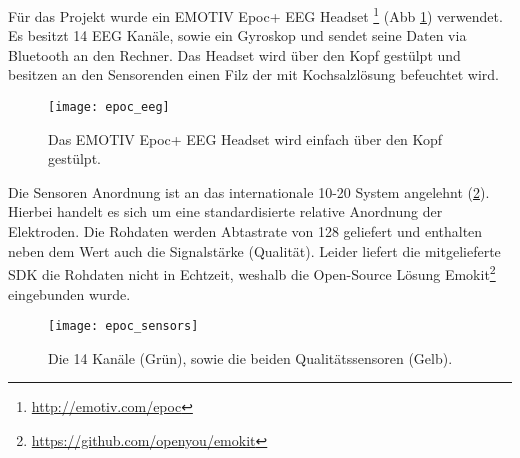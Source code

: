 \label{chap:eeg}
Für das Projekt wurde ein EMOTIV Epoc+ EEG Headset \footnote{\url{http://emotiv.com/epoc}} (Abb \ref{fig:epoc_eeg}) verwendet. Es besitzt 14 EEG Kanäle, sowie ein Gyroskop und sendet seine Daten via Bluetooth an den Rechner. Das Headset wird über den Kopf gestülpt und besitzen an den Sensorenden einen Filz der mit Kochsalzlösung befeuchtet wird. 

\begin{figure}[h] 
  \begin{center}
    \texttt{[image: epoc\_eeg]}
    \caption[EMOTIV Epoc]{Das EMOTIV Epoc+ EEG Headset wird einfach über den Kopf gestülpt.\label{fig:epoc_eeg}}
  \end{center}
\end{figure}

Die Sensoren Anordnung ist an das internationale 10-20 System \cite{10-20}  angelehnt (\ref{fig:epoc_sensors}). Hierbei handelt es sich um eine standardisierte relative Anordnung der Elektroden. Die Rohdaten werden Abtastrate von 128 geliefert und enthalten neben dem Wert auch die Signalstärke (Qualität). Leider liefert die mitgelieferte SDK die Rohdaten nicht in Echtzeit, weshalb die Open-Source Lösung Emokit\footnote{\url{https://github.com/openyou/emokit}} eingebunden wurde.

\begin{figure}[h] 
  \begin{center}
    \texttt{[image: epoc\_sensors]}
    \caption[EEG Sensoren]{Die 14 Kanäle (Grün), sowie die beiden Qualitätssensoren (Gelb).\label{fig:epoc_sensors}}
  \end{center}
\end{figure}